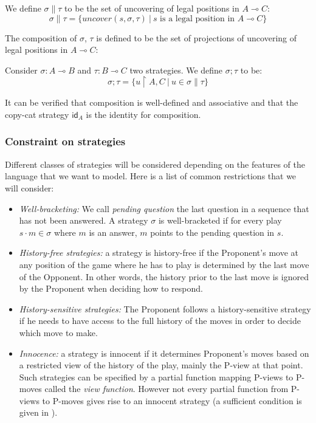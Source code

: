 We define $\sigma \| \tau $ to be the set of uncovering of legal
positions in $A \multimap C$:
$$ \sigma \| \tau = \{ uncover(s, \sigma, \tau) \ | \ s \mbox{ is a legal position in } A \multimap C \}$$

The composition of $\sigma$, $\tau$ is defined to be the set of
projections of uncovering of legal positions in $A \multimap C$:

\begin{dfn}
Consider $\sigma : A \multimap B$ and  $\tau : B \multimap C$ two
strategies. We define $\sigma ; \tau$ to be:
$$ \sigma ; \tau = \{ u \upharpoonright A,C \ | \ u \in \sigma \|
\tau \}$$
\end{dfn}

It can be verified that composition is well-defined and associative
\citep{hylandong_pcf} and that the copy-cat strategy $\textsf{id}_A$ is the identity for composition.

\subsubsection{Constraint on strategies}

Different classes of strategies will be considered depending on the
features of the language that we want to model. Here is a list of
common restrictions that we will consider:
\begin{itemize}
\item \emph{Well-bracketing:}
We call \emph{pending question} the last question in a sequence that has not been answered.
A strategy $\sigma$ is well-bracketed if for every play $s \cdot m \in \sigma$ where $m$ is an answer, $m$ points to the pending question in $s$.

\item \emph{History-free strategies:} a strategy is history-free if the Proponent's move at any position of the game where he has to play
is determined by the last move of the Opponent. In other words, the
history prior to the last move is ignored by the Proponent when
deciding how to respond.

\item \emph{History-sensitive strategies:} The Proponent follows a history-sensitive strategy if he needs to have access to the full
history of the moves in order to decide which move to make.

\item \emph{Innocence:} a strategy is innocent if it determines Proponent's moves based on a restricted view of the history of the play, mainly the P-view
at that point. Such strategies can be specified by a partial
function mapping P-views to P-moves called the \emph{view function}. However not every partial
function from P-views to P-moves gives rise to an innocent strategy
(a sufficient condition is given in \cite{hylandong_pcf}).
\end{itemize}

